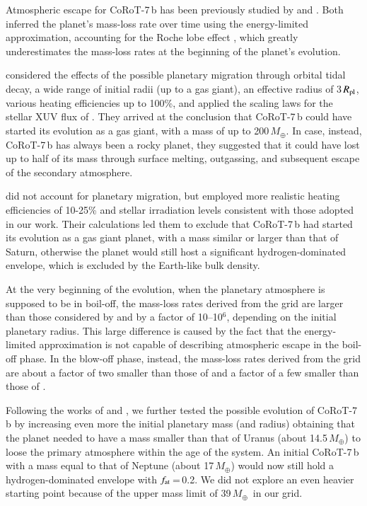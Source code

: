 \documentclass{aa}
\def\Me{\ensuremath{M_{\oplus}}}
\begin{document}
Atmospheric escape for CoRoT-7\,b has been previously studied by \citet{jackson2010} and \citet{leitzinger2011}. Both inferred the planet's mass-loss rate over time using the energy-limited approximation, accounting for the Roche lobe effect \citep{erkaev2007}, which greatly underestimates the mass-loss rates at the beginning of the planet's evolution.

\citet{jackson2010} considered the effects of the possible planetary migration through orbital tidal decay, a wide range of initial radii (up to a gas giant), an effective radius of 3\,$R_{\rm pl}$, various heating efficiencies up to 100\%, and applied the scaling laws for the stellar XUV flux of \citet{ribas2005}. They arrived at the conclusion that CoRoT-7\,b could have started its evolution as a gas giant, with a mass of up to 200\,\Me. In case, instead, CoRoT-7\,b has always been a rocky planet, they suggested that it could have lost up to half of its mass through surface melting, outgassing, and subsequent escape of the secondary atmosphere.

\citet{leitzinger2011} did not account for planetary migration, but employed more realistic heating efficiencies of 10-25\% and stellar irradiation levels consistent with those adopted in our work. Their calculations led them to exclude that CoRoT-7\,b had started its evolution as a gas giant planet, with a mass similar or larger than that of Saturn, otherwise the planet would still host a significant hydrogen-dominated envelope, which is excluded by the Earth-like bulk density.

{At the very beginning of the evolution, when the planetary
atmosphere is supposed to be in boil-off, the mass-loss rates
derived from the grid are larger than those considered by
\citet{jackson2010} and \citet{leitzinger2011} by a factor of
10--10$^6$, depending on the initial planetary radius. This large
difference is caused by the fact that the energy-limited
approximation is not capable of describing atmospheric escape in
the boil-off phase. In the blow-off phase, instead, the mass-loss
rates derived from the grid are about a factor of two smaller than
those of \citet{leitzinger2011} and a factor of a few smaller than
those of \citet{jackson2010}.}

{Following the works of \citet{jackson2010} and
\citet{leitzinger2011}, we further tested the possible evolution
of CoRoT-7\,b by increasing even more the initial planetary mass
(and radius) obtaining that the planet needed to have a mass
smaller than that of Uranus (about 14.5\,\Me) to loose the primary
atmosphere within the age of the system. An initial CoRoT-7\,b
with a mass equal to that of Neptune (about 17\,\Me) would now
still hold a hydrogen-dominated envelope with $f_{\rm
at}$\,=\,0.2. We did not explore an even heavier starting point
because of the upper mass limit of 39\,\Me\ in our grid.}
%
\end{document}
